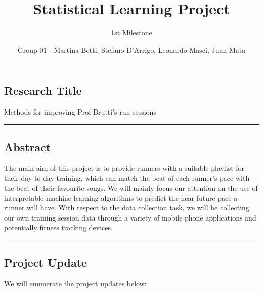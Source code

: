 \documentclass[
  12pt,
]{article}
\title{Statistical Learning Project}
\author{1st Milestone}
\date{Group 01 - Martina Betti, Stefano D'Arrigo, Leonardo Masci, Juan Mata}
\begin{document}
\maketitle

\hypertarget{research-title}{%
\subsection{Research Title}\label{research-title}}

Methods for improving Prof Brutti's run sessions

\begin{center}\rule{0.5\linewidth}{0.5pt}\end{center}

\hypertarget{abstract}{%
\subsection{Abstract}\label{abstract}}

The main aim of this project is to provide runners with a suitable
playlist for their day to day training, which can match the beat of each
runner's pace with the beat of their favourite songs. We will mainly
focus our attention on the use of interpretable machine learning
algorithms to predict the near future pace a runner will have. With
respect to the data collection task, we will be collecting our own
training session data through a variety of mobile phone applications and
potentially fitness tracking devices.

\begin{center}\rule{0.5\linewidth}{0.5pt}\end{center}

\hypertarget{project-update}{%
\subsection{Project Update}\label{project-update}}

We will enumerate the project updates below:
\end{document}
